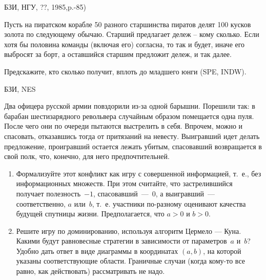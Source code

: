 \begin{problem}[Пираты]
\begin{source}
БЗИ, НГУ, \cite{mulen:gt}??, 1985,p.-85)
\end{source}
 Пусть на пиратском
корабле 50 разного старшинства пиратов делят 100 кусков
золота по следующему обычаю. Старший предлагает дележ --
кому сколько. Если хотя бы половина команды (включая его)
согласна, то так и будет, иначе его выбросят за борт, а
оставшийся старшим предложит дележ, и так далее.

Предскажите, кто сколько получит, вплоть до младшего юнги
(SPE, INDW).



\begin{sol}

\end{sol}
\end{problem}








\begin{problem}
\begin{source}
БЗИ, NES
\end{source}
 Два офицера русской армии
повздорили из-за одной барышни. Порешили так: в барабан
шестизарядного револьвера случайным образом помещается одна
пуля. После чего они по очереди пытаются выстрелить в себя.
Впрочем, можно и спасовать, отказавшись тогда от притязаний
на невесту. Выигравший идет делать предложение, проигравший
остается лежать убитым, спасовавший возвращается в свой
полк, что, конечно, для него предпочтительней.

\begin{enumerate}

\item Формализуйте этот конфликт как игру с {\rm
совершенной информацией}, т.~е., без информационных
множеств. При этом считайте, что застрелившийся получает
полезность~$-1$, спасовавший~---~$0$, а выигравший~---
соответственно, $a$ или~$b$, т.~е. участники по-разному
оценивают качества будущей спутницы жизни.
Предполагается, что $a>0$ и $b>0$.

\item  Решите игру по доминированию, используя алгоритм
Цермело --- Куна. Какими будут равновесные стратегии в
зависимости от параметров~$a$ и~$b$? Удобно дать ответ в
виде диаграммы в координатах $(a,b)$, на которой указаны
соответствующие области. Граничные случаи (когда кому-то
все равно, как действовать) рассматривать не надо.

\end{enumerate}







\begin{sol}

\end{sol}
\end{problem}




